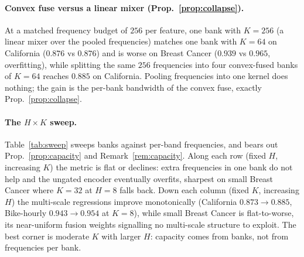 \documentclass[11pt]{article}
\theoremstyle{definition}
\begin{document}
\paragraph{Convex fuse versus a linear mixer (Prop.~\ref{prop:collapse}).} At a matched frequency
budget of $256$ per feature, one bank with $K{=}256$ (a linear mixer over the pooled frequencies)
matches one bank with $K{=}64$ on California ($0.876$ vs $0.876$) and is worse on Breast Cancer
($0.939$ vs $0.965$, overfitting), while splitting the same $256$ frequencies into four
convex-fused banks of $K{=}64$ reaches $0.885$ on California. Pooling frequencies into one kernel
does nothing; the gain is the per-bank bandwidth of the convex fuse, exactly
Prop.~\ref{prop:collapse}.

\paragraph{The $H\times K$ sweep.} Table~\ref{tab:sweep} sweeps banks against per-band
frequencies, and bears out Prop.~\ref{prop:capacity} and Remark~\ref{rem:capacity}. Along each
row (fixed $H$, increasing $K$) the metric is flat or declines: extra frequencies in one bank do
not help and the ungated encoder eventually overfits, sharpest on small Breast Cancer where
$K{=}32$ at $H{=}8$ falls back. Down each column (fixed $K$, increasing $H$) the multi-scale
regressions improve monotonically (California $0.873\to0.885$, Bike-hourly $0.943\to0.954$ at
$K{=}8$), while small Breast Cancer is flat-to-worse, its near-uniform fusion weights signalling no
multi-scale structure to exploit. The best corner is moderate $K$ with larger $H$: capacity comes
from banks, not from frequencies per bank.
\end{document}

